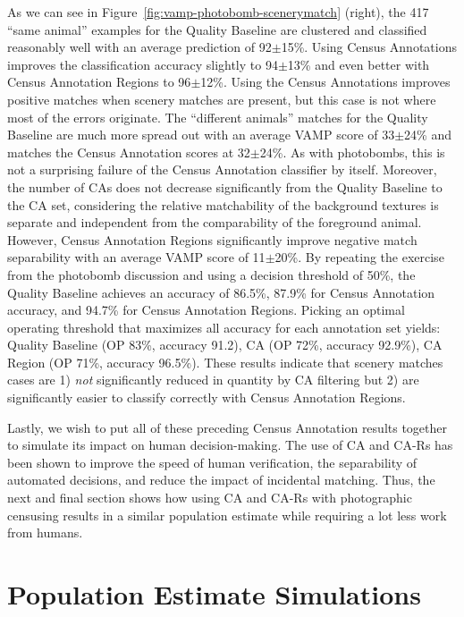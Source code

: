 As we can see in Figure~\ref{fig:vamp-photobomb-scenerymatch} (right), the 417 ``same animal'' examples for the Quality Baseline are clustered and classified reasonably well with an average prediction of 92$\pm$15\%.  Using Census Annotations improves the classification accuracy slightly to 94$\pm$13\% and even better with Census Annotation Regions to 96$\pm$12\%.  Using the Census Annotations improves positive matches when scenery matches are present, but this case is not where most of the errors originate.  The ``different animals'' matches for the Quality Baseline are much more spread out with an average VAMP score of 33$\pm$24\% and matches the Census Annotation scores at 32$\pm$24\%.  As with photobombs, this is not a surprising failure of the Census Annotation classifier by itself.  Moreover, the number of CAs does not decrease significantly from the Quality Baseline to the CA set, considering the relative matchability of the background textures is separate and independent from the comparability of the foreground animal.  However, Census Annotation Regions significantly improve negative match separability with an average VAMP score of 11$\pm$20\%.  By repeating the exercise from the photobomb discussion and using a decision threshold of 50\%, the Quality Baseline achieves an accuracy of 86.5\%, 87.9\% for Census Annotation accuracy, and 94.7\% for Census Annotation Regions. Picking an optimal operating threshold that maximizes all accuracy for each annotation set yields: Quality Baseline (OP 83\%, accuracy 91.2), CA (OP 72\%, accuracy 92.9\%), CA Region (OP 71\%, accuracy 96.5\%).  These results indicate that scenery matches cases are 1) \textit{not} significantly reduced in quantity by CA filtering but 2) are significantly easier to classify correctly with Census Annotation Regions.

Lastly, we wish to put all of these preceding Census Annotation results together to simulate its impact on human decision-making.  The use of CA and CA-Rs has been shown to improve the speed of human verification, the separability of automated decisions, and reduce the impact of incidental matching. Thus, the next and final section shows how using CA and CA-Rs with photographic censusing results in a similar population estimate while requiring a lot less work from humans.

\section{Population Estimate Simulations} \label{sec:ca-sims}


